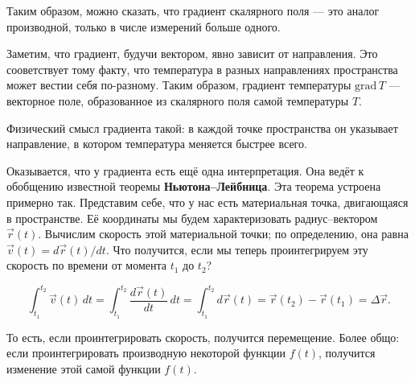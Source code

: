 \documentclass[a4paper,12pt]{article}
\numberwithin{equation}{section}
\newcommand{\grad}{\mathrm{grad}\,}
\begin{document}
Таким образом, можно сказать, что градиент скалярного поля --- это
аналог производной, только в числе измерений больше одного. 

Заметим, что градиент, будучи вектором, явно зависит от
направления. Это сооветствует тому факту, что температура в разных
направлениях пространства может вестии себя по-разному. Таким образом,
градиент температуры $\grad T$ --- векторное поле, образованное из скалярного
поля самой температуры $T$.

Физический смысл градиента такой: в каждой точке пространства он
указывает направление, в котором температура меняется быстрее всего. 

Оказывается, что у градиента есть ещё одна интерпретация. Она ведёт к
обобщению известной теоремы \textbf{Ньютона--Лейбница}. Эта теорема
устроена примерно так. Представим себе, что у нас есть материальная
точка, двигающаяся в пространстве. Её координаты мы будем
характеризовать радиус--вектором $\vec{r}(t)$. Вычислим скорость этой
материальной точки; по определению, она равна $\vec{v} (t) = d
\vec{r}(t) / dt$. Что получится, если мы теперь проинтегрируем эту
скорость по времени от момента $t_1$ до $t_2$? 

\begin{equation}
  \label{eq:newton_leibnitz}
  \int_{t_1}^{t_2} \vec{v}(t) \, dt = \int_{t_1}^{t_2}
  \frac{d\vec{r}(t)} {dt} \, dt = \int_{t_1}^{t_2} d\vec{r}(t) =
  \vec{r}(t_2) - \vec{r}(t_1) = \Delta \vec{r}.
\end{equation}

\begin{figure}
  \vspace{-1.2cm}
  \begin{center}
  \end{center}
  \label{fig:curve_int}
\end{figure}


То есть, если проинтегрировать скорость, получится перемещение. Более
общо: если проинтегрировать производную некоторой функции $f(t)$,
получится изменение этой самой функции $f(t)$. 
\end{document}
